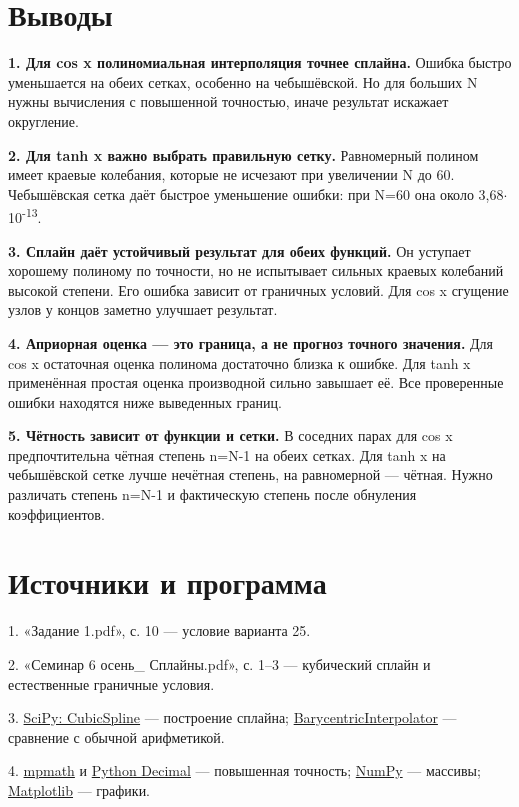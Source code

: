 \documentclass[12pt,a4paper]{article}
\begin{document}
\clearpage
\section{Выводы}
\textbf{1. Для cos x полиномиальная интерполяция точнее сплайна.} Ошибка быстро уменьшается на обеих сетках, особенно на чебышёвской. Но для больших N нужны вычисления с повышенной точностью, иначе результат искажает округление.

\textbf{2. Для tanh x важно выбрать правильную сетку.} Равномерный полином имеет краевые колебания, которые не исчезают при увеличении N до 60. Чебышёвская сетка даёт быстрое уменьшение ошибки: при N=60 она около 3,68\ensuremath{\cdot}10\textsuperscript{-13}.

\textbf{3. Сплайн даёт устойчивый результат для обеих функций.} Он уступает хорошему полиному по точности, но не испытывает сильных краевых колебаний высокой степени. Его ошибка зависит от граничных условий. Для cos x сгущение узлов у концов заметно улучшает результат.

\textbf{4. Априорная оценка — это граница, а не прогноз точного значения.} Для cos x остаточная оценка полинома достаточно близка к ошибке. Для tanh x применённая простая оценка производной сильно завышает её. Все проверенные ошибки находятся ниже выведенных границ.

\textbf{5. Чётность зависит от функции и сетки.} В соседних парах для cos x предпочтительна чётная степень n=N-1 на обеих сетках. Для tanh x на чебышёвской сетке лучше нечётная степень, на равномерной — чётная. Нужно различать степень n=N-1 и фактическую степень после обнуления коэффициентов.

\section{Источники и программа}
1. «Задание 1.pdf», с. 10 — условие варианта 25.\par
2. «Семинар 6 осень\_ Сплайны.pdf», с. 1–3 — кубический сплайн и естественные граничные условия.\par
3. \href{https://docs.scipy.org/doc/scipy/reference/generated/scipy.interpolate.CubicSpline.html}{SciPy: CubicSpline} — построение сплайна; \href{https://docs.scipy.org/doc/scipy/reference/generated/scipy.interpolate.BarycentricInterpolator.html}{BarycentricInterpolator} — сравнение с обычной арифметикой.\par
4. \href{https://mpmath.org/}{mpmath} и \href{https://docs.python.org/3/library/decimal.html}{Python Decimal} — повышенная точность; \href{https://numpy.org/}{NumPy} — массивы; \href{https://matplotlib.org/}{Matplotlib} — графики.
\end{document}
